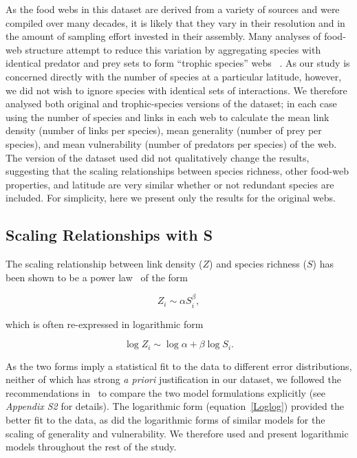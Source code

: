 \documentclass[12pt]{article}
\begin{document}
    As the food webs in this dataset are derived from a variety of sources and were compiled over many decades, it
    is likely that they vary in their resolution and in the amount of sampling effort invested in their assembly.
    Many analyses of food-web structure attempt to reduce this variation by aggregating species with identical predator and prey
    sets to form ``trophic species'' webs ~\citep{Martinez1991,Dunne2004,Vermaat2009,Dunne2013}. As our study
    is concerned directly with the number of species at a particular latitude, however, we did not wish to ignore 
    species with identical sets of interactions. We therefore analysed both original and trophic-species versions
    of the dataset; in each case using the number of species and 
    links in each web to calculate the mean link density (number of links per species), mean generality 
    (number of prey per species), and mean vulnerability (number of predators per species) of the web. 
    The version of the dataset used did not qualitatively change the results, suggesting that
    the scaling relationships between species richness, other food-web properties, and latitude are very 
    similar whether or not redundant species are included. For simplicity, here we present only
    the results for the original webs.


  \subsection*{Scaling Relationships with S}

    The scaling relationship between link density ($Z$) and species richness ($S$)
    has been shown to be a power law~\citep{Riede2010} of the form 

    \begin{equation}
    \label{Power}
    Z_{i} \sim \alpha S_{i}^{\beta}  ,
    \end{equation}

    \noindent which is often re-expressed in logarithmic form 

    \begin{equation}
    \label{Loglog}
    \log{Z_{i}} \sim \log{\alpha} + \beta\log{S_{i}}  .
    \end{equation}

    \noindent As the two forms imply a statistical fit to the data to different error 
    distributions, neither of which has strong
    \emph{a priori} justification in our dataset, we followed the recommendations in~\citet{Xiao2011}
    to compare the two model formulations explicitly (see \emph{Appendix S2} for details). 
    The logarithmic form (equation~\ref{Loglog}) provided the better fit to the data,
    as did the logarithmic forms of similar models for the scaling of generality and vulnerability. 
    We therefore used and present logarithmic models throughout the rest of the study.
\end{document}
